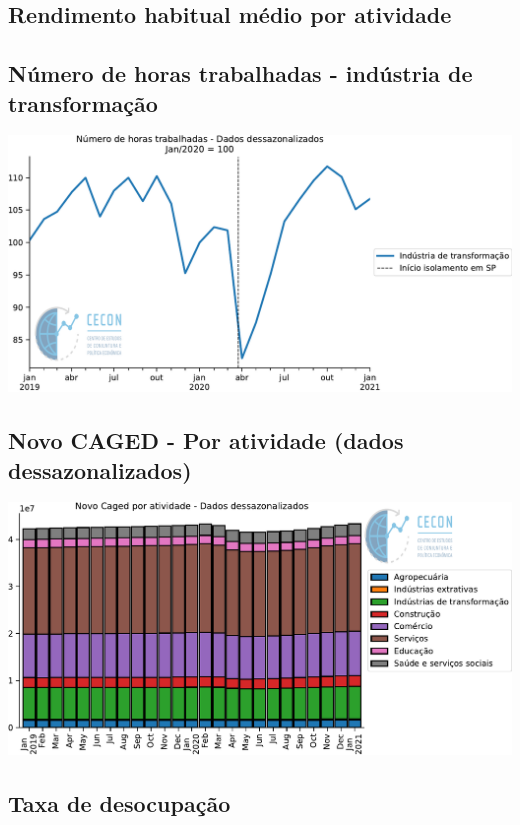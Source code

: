 \documentclass{SelfArx}
\begin{document}
\subsection*{Rendimento habitual médio por atividade}
\label{sec:orgcac5172}

\subsection*{Número de horas trabalhadas - indústria de transformação}
\label{sec:org90668f7}

\begin{center}
\includegraphics[width=.9\linewidth]{./figs/Emprego/Horas_Transformacao.pdf}
\end{center}

\subsection*{Novo CAGED  - Por atividade (dados dessazonalizados)}
\label{sec:org8666e76}

\begin{center}
\includegraphics[width=.9\linewidth]{./figs/Emprego/NovoCaged_Atividade.pdf}
\end{center}



\subsection*{Taxa de desocupação}
\label{sec:org6b6bb86}
\end{document}
